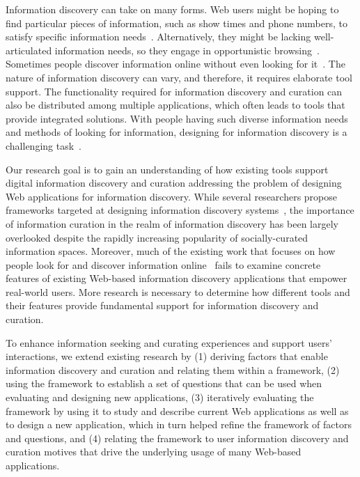 \documentclass{sigchi}
\begin{document}
Information discovery can take on many forms. Web users might be hoping to find particular pieces of information, such as show times and phone numbers, to satisfy specific information needs~\cite{proper1999information}. Alternatively, they might be lacking well-articulated information needs, so they engage in opportunistic browsing~\cite{lindley2012s}. Sometimes people discover information online without even looking for it~\cite{bates1986exploratory}. The nature of information discovery can vary, and therefore, it requires elaborate tool support. The functionality required for information discovery and curation can also be distributed among multiple applications, which often leads to tools that provide integrated solutions. With people having such diverse information needs and methods of looking for information, designing for information discovery is a challenging task~\cite{conaway2010designing, marchionini2006exploratory}.

Our research goal is to gain an understanding of how existing tools support digital information discovery and curation addressing the problem of designing Web applications for information discovery. While several researchers propose frameworks targeted at designing information discovery systems~\cite{proper1999information, kerne2004information}, the importance of information curation in the realm of information discovery has been largely overlooked despite the rapidly increasing popularity of socially-curated information spaces. Moreover, much of the existing work that focuses on how people look for and discover information online~\cite{bates1986exploratory, choo2000information, ellis1989behavioural, kellar2006goal, lindley2012s, morrison2001taxonomic, sellen2002knowledge} fails to examine concrete features of existing Web-based information discovery applications that empower real-world users. More research is necessary to determine how different tools and their features provide fundamental support for information discovery and curation.

To enhance information seeking and curating experiences and support users' interactions, we extend existing research by (1) deriving factors that enable information discovery and curation and relating them within a framework, (2) using the framework to establish a set of questions that can be used when evaluating and designing new applications, (3) iteratively evaluating the framework by using it to study and describe current Web applications as well as to design a new application, which in turn helped refine the framework of factors and questions, and (4) relating the framework to user information discovery and curation motives that drive the underlying usage of many Web-based applications.
\end{document}
